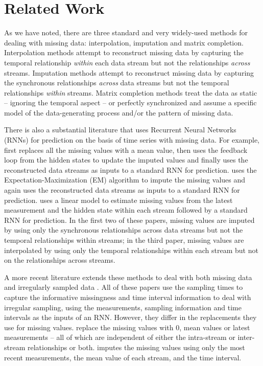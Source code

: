 \documentclass{article}
\begin{document}
	
	\section{Related Work}	

    As we have noted, there are three  standard and very widely-used methods for dealing with missing data: interpolation, imputation and matrix completion. Interpolation methods \cite{interpolation,wavelet} attempt to reconstruct missing data by capturing the temporal relationship {\em within} each data stream but not the relationships {\em across} streams. Imputation methods \cite{Rubin,EM,MICE,missforest} attempt to reconstruct missing data by capturing the synchronous relationships {\em across} data streams but not the temporal relationships {\em within} streams. Matrix completion methods \cite{Mat-0,Mat-1,Mat-2,Mat-3} treat the data as static -- ignoring the temporal aspect -- or perfectly synchronized and assume a specific model of the data-generating process and/or the pattern of missing data.  
    

	There is also a substantial  literature that uses Recurrent Neural Networks (RNNs) for prediction on the basis of time series with missing data.  For example, \cite{Early_RNN1} first replaces all the missing values with a mean value, then uses the feedback loop from the hidden states to update the imputed values and finally uses the reconstructed data streams as inputs to a standard RNN for prediction.  \cite{Early_RNN2} uses  the Expectation-Maximization (EM) algorithm to impute the missing values and again uses the reconstructed data streams as inputs to a standard RNN for prediction.   \cite{Early_RNN3} uses a linear model to estimate missing values from the latest measurement and the hidden state within each stream followed by a standard RNN for prediction.  In the first two of these papers, missing values are imputed by using only the synchronous relationships across data streams but not the  temporal relationships within streams; in the  third paper, missing values are interpolated by using only the temporal relationships within each stream but not on the relationships across streams.   
	
	A more recent literature extends these methods to deal with both missing data and irregularly sampled data \cite{Recent_RNN1,Recent_RNN2,Recent_RNN3,Recent_RNN5}. All of these papers use the sampling times to capture the informative missingness and time interval information to deal with irregular sampling, using the measurements, sampling information and time intervals as the inputs of an RNN. However, they differ in the replacements they use for missing values. \cite{Recent_RNN1,Recent_RNN2,Recent_RNN5} replace the missing values with 0, mean values or latest measurements -- all of which are independent of either the intra-stream or inter-stream relationships or both. \cite{Recent_RNN3} imputes the missing values using only the most recent measurements, the mean value of each stream, and the time interval.
	
\end{document}
